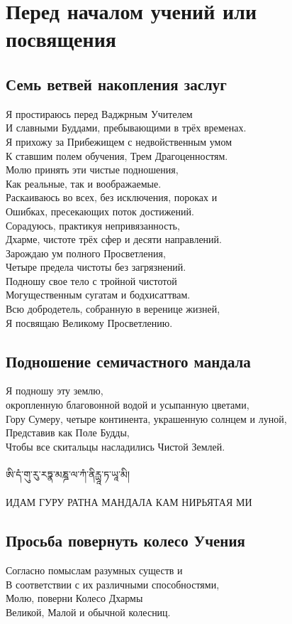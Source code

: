\section{Перед началом учений или посвящения}

\subsection{Семь ветвей накопления заслуг}

Я простираюсь перед Ваджрным Учителем\\
И славными Буддами, пребывающими в трёх временах.\\
Я прихожу за Прибежищем с недвойственным умом\\
К ставшим полем обучения, Трем Драгоценностям.\\
Молю принять эти чистые подношения,\\
Как реальные, так и воображаемые.\\
Раскаиваюсь во всех, без исключения, пороках и\\
Ошибках, пресекающих поток достижений.\\
Сорадуюсь, практикуя непривязанность,\\
Дхарме, чистоте трёх сфер и десяти направлений.\\
Зарождаю ум полного Просветления,\\
Четыре предела чистоты без загрязнений.\\
Подношу свое тело с тройной чистотой\\
Могущественным сугатам и бодхисаттвам.\\
Всю добродетель, собранную в веренице жизней,\\
Я посвящаю Великому Просветлению.
\newpage

\subsection{Подношение семичастного мандала}

Я подношу эту землю, \\
\indent окропленную благовонной водой и усыпанную цветами,\\
Гору Сумеру, четыре континента, украшенную солнцем и луной,\\
Представив как Поле Будды,\\
Чтобы все скитальцы насладились Чистой Землей.\\
\\
\ti
ཨི་དཾ་གུ་རུ་རཏྣ་མཎྜ་ལ་ཀཾ་ནིརྻཱ་ཏ་ཡཱ་མི།\\
\\
\ru ИДАМ ГУРУ РАТНА МАНДАЛА КАМ НИРЬЯТАЯ МИ

\subsection{Просьба повернуть колесо Учения}

Согласно помыслам разумных существ и\\
В соответствии с их различными способностями,\\
Молю, поверни Колесо Дхармы\\
Великой, Малой и обычной колесниц.
